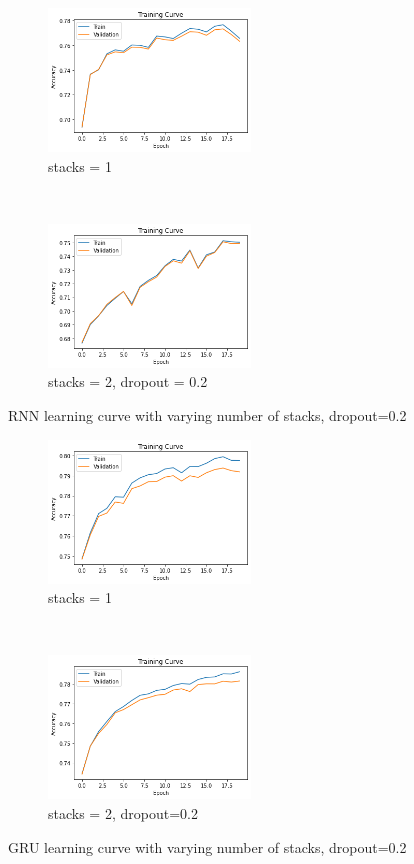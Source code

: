 \documentclass{article}
\begin{document}
\begin{figure}[ht!]
    \centering
    \begin{subfigure}[t]{0.5\textwidth}
        \centering
        \includegraphics[height=1.5in]{img/sa-dim-search/rnn-training-dim50}
        \caption{stacks = 1}
    \end{subfigure}%
    ~ 
    \begin{subfigure}[t]{0.5\textwidth}
        \centering
        \includegraphics[height=1.5in]{img/sa-dim-search/rnn-training-dim50-stacked-dropout}
        \caption{stacks = 2, dropout = 0.2}
    \end{subfigure}
    \caption{RNN learning curve with varying number of stacks, dropout=0.2}
\end{figure}
\begin{figure}[ht!]
    \centering
    \begin{subfigure}[t]{0.5\textwidth}
        \centering
        \includegraphics[height=1.5in]{img/sa-dim-search/gru-training-dim50}
        \caption{stacks = 1}
    \end{subfigure}%
    ~ 
    \begin{subfigure}[t]{0.5\textwidth}
        \centering
        \includegraphics[height=1.5in]{img/sa-dim-search/gru-training-dim50-stacked-dropout}
        \caption{stacks = 2, dropout=0.2}
    \end{subfigure}
    \caption{GRU learning curve with varying number of stacks, dropout=0.2}
\end{figure}
\end{document}
